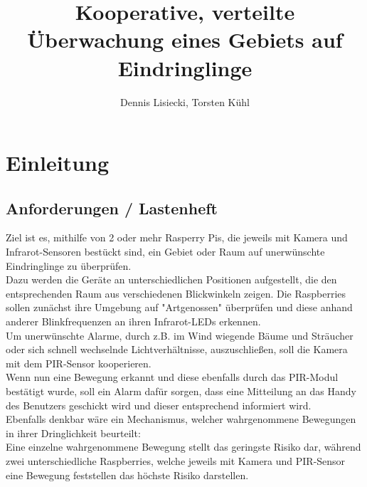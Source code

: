 \message{ !name(Verteilte Überwachung.tex)}\documentclass[12pt,a4paper]{scrreprt}
\title{Kooperative, verteilte Überwachung eines Gebiets auf Eindringlinge}
\author{Dennis Lisiecki, Torsten Kühl}
\begin{document}


\maketitle	%
\tableofcontents	%

\chapter{Einleitung}
\section{Anforderungen / Lastenheft}
Ziel ist es, mithilfe von 2 oder mehr Rasperry Pis, die jeweils mit Kamera und Infrarot-Sensoren bestückt sind, ein Gebiet oder Raum auf unerwünschte Eindringlinge zu überprüfen.\\
Dazu werden die Geräte an unterschiedlichen Positionen aufgestellt, die den entsprechenden Raum aus verschiedenen Blickwinkeln zeigen. Die Raspberries sollen zunächst ihre Umgebung auf "Artgenossen" überprüfen und diese anhand anderer Blinkfrequenzen an ihren Infrarot-LEDs erkennen. \\
Um unerwünschte Alarme, durch z.B. im Wind wiegende Bäume und Sträucher oder sich schnell wechselnde Lichtverhältnisse, auszuschließen, soll die Kamera mit dem PIR-Sensor kooperieren. \\
Wenn nun eine Bewegung erkannt und diese ebenfalls durch das PIR-Modul bestätigt wurde, soll ein Alarm dafür sorgen, dass eine Mitteilung an das Handy des Benutzers geschickt wird und dieser entsprechend informiert wird.\\
Ebenfalls denkbar wäre ein Mechanismus, welcher wahrgenommene Bewegungen in ihrer Dringlichkeit beurteilt:\\
Eine einzelne wahrgenommene Bewegung stellt das geringste Risiko dar, während zwei unterschiedliche Raspberries, welche jeweils mit Kamera und PIR-Sensor eine Bewegung feststellen das höchste Risiko darstellen.

\end{document}
